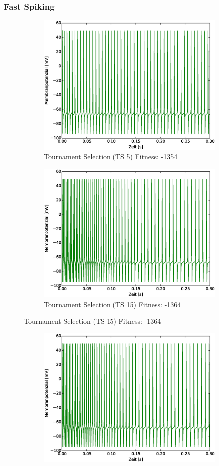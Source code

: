 \begin{frame}
  \frametitle{Fast Spiking}
  \begin{figure}
    \centering
    \begin{subfigure}{.5\textwidth}
      \centering
      \includegraphics*[viewport=19 10 532 394,width=0.7\linewidth]{genetic/fs-base.eps}
      \caption*{\scriptsize{Tournament Selection (TS 5)} \tiny{Fitness: -1354}}
    \end{subfigure}%
    \begin{subfigure}{.5\textwidth}
      \centering
      \includegraphics*[viewport=19 10 532 394,width=0.7\linewidth]{genetic/fs-tsize15.eps}
      \caption*{\scriptsize{Tournament Selection (TS 15)} \tiny{Fitness: -1364}}
    \end{subfigure}
  \end{figure}
  \begin{figure}
    \centering
    \begin{subfigure}{.5\textwidth}
      \centering
      \includegraphics*[viewport=19 10 532 394,width=0.7\linewidth]{genetic/fs-trunc-sel.eps}

\end{subfigure}
\end{figure}
\end{frame}
